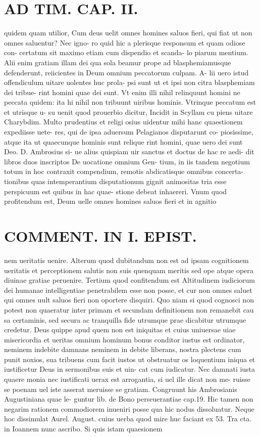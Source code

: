 \documentclass{article}
\begin{document}
\begin{pages}
\section*{AD TIM. CAP. II. }
\marginpar{[ p.114 ]}\pstart quidem quam utilior, Cum deus uelit omnes homines saluos fieri, qui fiat ut non omnes saluentur? Nec igno- ro quid hic a plerisque responsum et quam odiose con- certatum sit maximo etiam cum dispendio et scanda- lo piarum mentium. Alii enim gratiam illam dei qua sola beamur prope ad blasphemiamusque defenderunt, reiicientes in Deum omnium peccatorum culpam. A- lii uero istud offendiculum uitare uolentes huc prola- psi sunt ut et ipsi non citra blasphemiam dei tribue- rint homini quae dei sunt. Vt enim illi nihil relinquunt homini ne peccata quidem: ita hi nihil non tribuunt uiribus hominis. Vtrinque peccatum est et utrisque u- su uenit quod prouerbio dicitur, Incidit in Scyllam cu piens uitare Charybdim. Multo prudentius et religi osius uidentur mihi hanc quaestionem expediisse uete- res, qui de ipsa aduersum Pelagianos disputarunt co- piosissime, atque ita ut quaecunque hominis sunt relique rint homini, quae uero dei sunt Deo. D. Ambrosius si- ue alius quispiam uir sanctus et doctus de hac re aedi- dit libros duos inscriptos De uocatione omnium Gen- tium, in iis tandem negotium totum in hoc contraxit compendium, remotis abdicatisque omnibus concerta- tionibus quas intemperantium disputationum gignit animositas tria esse perspicuum est quibus in hac quae- stione debeat inhaereri. Vnum quod profitendum est, Deum uelle omnes homines saluos fieri et in agnitio  \pend
\section*{COMMENT. IN I. EPIST. }\pstart nem ueritatis uenire. Alterum quod dubitandum non est ad ipsam cognitionem ueritatis et perceptionem salutis non suis quenquam meritis sed ope atque opera diuinae gratiae peruenire. Tertium quod confitendum est Altitudinem iudiciorum dei humanae intelligentiae penetrabilem esse non posse, et cur non omnes saluet qui omnes uult saluos fieri non oportere disquiri. Quo niam si quod cognosci non potest non quaeratur inter primam et secundam definitionem non remanebit cau sa certaminis, sed secura ac tranquilla fide utrumque prae dicabitur utrumque credetur. Deus quippe apud quem non est iniquitas et cuius uniuersae uiae misericordia et ueritas omnium hominum bonus conditor iustus est ordinator, neminem indebite damnans neminem in debite liberans, nostra plectens cum punit noxios, sua tribuens cum facit iustos ut obstruatur os loquentium iniqua et iustificetur Deus in sermonibus suis et uin- cat cum iudicatur. Nec damnati iusta quaere monia nec iustificati uerax est arrogantia, si uel ille dicat non me- ruisse se poenam uel iste asserat meruisse se gratiam. Congruunt his Ambrosianis Augustiniana quae le- guntur lib. de Bono perseuerantiae cap.19. Hic tamen non negarim rationem commodiorem inueniri posse qua hic nodus dissoluatur. Neque hoc dissimulat Aurel. August. cuius uerba quod mire huc faciant ex 53. Tra cta. in Ioannem nunc ascribo. Si quis istam quaesionem  \pend

\end{pages}
\end{document}
